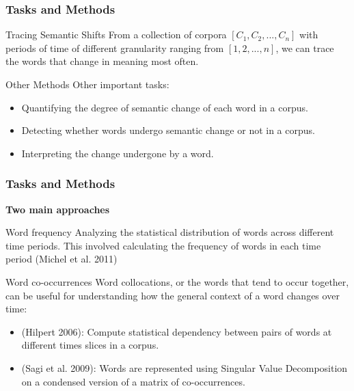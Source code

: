 \documentclass[
    11pt, %
    aspectratio=169, %
]{beamer}
\begin{document}
\begin{frame}
    \frametitle{Tasks and Methods}
    
     \begin{block}{Tracing Semantic Shifts} 
         From a collection of corpora $[C_{1},C_{2},...,C_{n} ]$ with periods of time of different granularity ranging from $[1,2,...,n]$, we can trace the words that change in meaning most often.
     \end{block}
     \begin{block}{Other Methods} 
         Other important tasks:
         \begin{itemize}
             \item Quantifying the degree of semantic change of each word in a corpus. 
             \item Detecting whether words undergo semantic change or not in a corpus.
             \item Interpreting the change undergone by a word.
         \end{itemize}
     \end{block}
    
\end{frame}



\begin{frame}
    \frametitle{Tasks and Methods}
    
     \textbf{Two main approaches}
     \begin{block}{Word frequency}
         Analyzing the statistical distribution of words across different time periods. This involved calculating the frequency of words in each time period (Michel et al. 2011)
     \end{block}
     \begin{block}{Word co-occurrences}
         Word collocations, or the words that tend to occur together, can be useful for understanding how the general context of a word changes over time:
         \begin{itemize}
             \item (Hilpert 2006): Compute statistical dependency between pairs of words at different times slices in a corpus.
             \item (Sagi et al. 2009): Words are represented using Singular Value Decomposition on a condensed version of a matrix of co-occurrences.
         \end{itemize}
     \end{block}
    
\end{frame}
\end{document}
